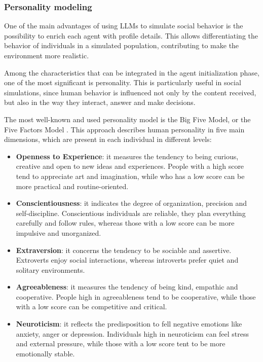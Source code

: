 \subsubsection{Personality modeling}
One of the main advantages of using LLMs to simulate social behavior is the possibility to enrich each agent with profile details.
This allows differentiating the behavior of individuals in a simulated population, contributing to make the environment more realistic.

Among the characteristics that can be integrated in the agent initialization phase, one of the most significant is personality.
This is particularly useful in social simulations, since human behavior is influenced not only by the content received, but also in the way they interact, answer and make decisions.

\medskip
The most well-known and used personality model is the Big Five Model, or the Five Factors Model \cite{barrick1991bigfive, McCrae1992}. This approach describes human personality in five main dimensions, which are present in each individual in different levels:

\begin{itemize}
    \item \textbf{Openness to Experience}: it measures the tendency to being curious, creative and open to new ideas and experiences. People with a high score tend to appreciate art and imagination, while who has a low score can be more practical and routine-oriented.
    
    \item \textbf{Conscientiousness}: it indicates the degree of organization, precision and self-discipline. Conscientious individuals are reliable, they plan everything carefully and follow rules, whereas those with a low score can be more impulsive and unorganized.
    
    \item \textbf{Extraversion}: it concerns the tendency to be sociable and assertive. Extroverts enjoy social interactions, whereas introverts prefer quiet and solitary environments. 
    
    \item \textbf{Agreeableness}: it measures the tendency of being kind, empathic and cooperative. People high in agreeableness tend to be cooperative, while those with a low score can be competitive and critical.
    
    \item \textbf{Neuroticism}: it reflects the predisposition to fell negative emotions like anxiety, anger or depression. Individuals high in neuroticism can feel stress and external pressure, while those with a low score tent to be more emotionally stable. 
\end{itemize}


